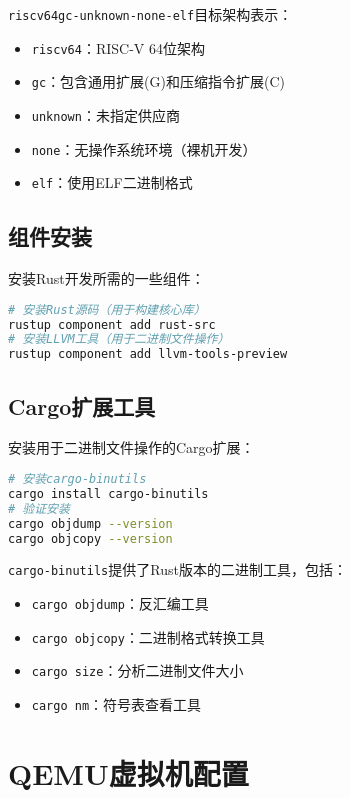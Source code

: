 \texttt{riscv64gc-unknown-none-elf}目标架构表示：
\begin{itemize}
    \item \texttt{riscv64}：RISC-V 64位架构
    \item \texttt{gc}：包含通用扩展(G)和压缩指令扩展(C)
    \item \texttt{unknown}：未指定供应商
    \item \texttt{none}：无操作系统环境（裸机开发）
    \item \texttt{elf}：使用ELF二进制格式
\end{itemize}

\subsection{组件安装}

安装Rust开发所需的一些组件：

\begin{lstlisting}[language=bash]
# 安装Rust源码（用于构建核心库）
rustup component add rust-src
# 安装LLVM工具（用于二进制文件操作）
rustup component add llvm-tools-preview
\end{lstlisting}

\subsection{Cargo扩展工具}

安装用于二进制文件操作的Cargo扩展：

\begin{lstlisting}[language=bash]
# 安装cargo-binutils
cargo install cargo-binutils
# 验证安装
cargo objdump --version
cargo objcopy --version
\end{lstlisting}

\texttt{cargo-binutils}提供了Rust版本的二进制工具，包括：
\begin{itemize}
    \item \texttt{cargo objdump}：反汇编工具
    \item \texttt{cargo objcopy}：二进制格式转换工具
    \item \texttt{cargo size}：分析二进制文件大小
    \item \texttt{cargo nm}：符号表查看工具
\end{itemize}

\section{QEMU虚拟机配置}

